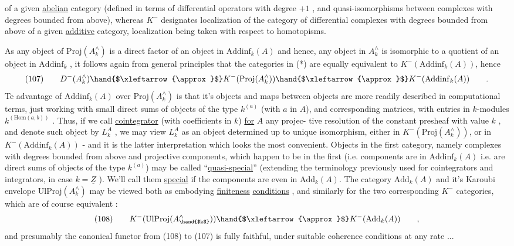 
of a given \uline{abelian} category (defined in terms of differential operators
with degree $+1$ , and quasi-isomorphisms between complexes with degrees
bounded from above), whereas $K^-$ designates localization of the category
of differential complexes with degrees bounded from above of a given
\uline{additive} category, localization being taken with respect to homotopisms.

As any object of $\mathrm{Proj}(A^{\wedge}_k)$ is a direct factor of an object in $\mathrm{Addinf}_k(A)$
and hence, any object in $A^{\wedge}_k$ is isomorphic to a quotient of an object in
$\mathrm{Addinf}_k$ , it follows again from general principles that the categories in
(*) are equally equivalent to $K^-(\mathrm{Addinf}_k(A))$, hence
\[ (107) \qquad D^-(A^{\wedge}_k)\hand{$\xleftarrow{\approx}$}K^-(\mathrm{Proj}(A^{\wedge}_k))\hand{$\xleftarrow{\approx}$}K^-(\mathrm{Addinf}_k(A)) \qquad . \]
Te advantage of $\mathrm{Addinf}_k(A)$ over $\mathrm{Proj}(A^{\wedge}_k)$ is that it's objects\hand{,} and maps
between objects\hand{,} are more readily described in computational terms, just
working with small direct sums of objects of the type $k^{(a)}$ (with $a$ in $A$),
and corresponding matrices, with entries in  $k$-modules $k^{(\mathrm{Hom}(a,b))}$ .
Thus, if we call \uline{cointegrator} (with coefficients in $k$) \uline{for} $A$ any projec-%
tive resolution of the constant  presheaf  with value $k$ , and denote
such object by $L^A_k$ , we may view $L^A_k$ as an object determined up to unique
isomorphism, either in $K^-(\mathrm{Proj}(A^{\wedge}_k))$, or in $K^-(\mathrm{Addinf}_k(A))$ - and it is
the latter interpretation which looks the most convenient. Objects in the
first category, namely complexes with degrees bounded from above
and projective components, which happen to be in the first (i.e. components
are in $\mathrm{Addinf}_k(A)$ i.e. are direct sums of objects of the type $k^{(a)}$) may
be called ``\uline{quasi-special}'' (extending the terminology previously used for
cointegrators and integrators, in case $k=\underline{Z}$ ). We'll call them \uline{special}
if the components are even in $\mathrm{Add}_k(A)$. The category $\mathrm{Add}_k(A)$ and it's
Karoubi envelope $\mathrm{UlProj}(A^{\wedge}_k)$ may be viewed both as embodying \uline{finiteness}
\uline{conditions} , and similarly for the two corresponding $K^-$ categories, which
are of course equivalent :
\[ (108) \qquad K^-(\mathrm{UlProj}(A^{\wedge}_{\hand{$k$}}))\hand{$\xleftarrow{\approx}$} K^-(\mathrm{Add}_k(A)) \qquad , \]
and presumably the canonical functor from (108) to (107) is fully faithful,
under suitable coherence conditions at any rate ...

